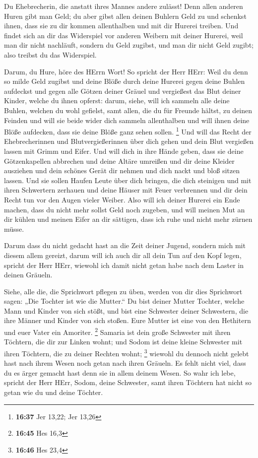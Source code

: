  Du Ehebrecherin, die anstatt ihres Mannes andere zulässt!
 Denn allen anderen Huren gibt man Geld; du aber gibst
allen deinen Buhlern Geld zu und schenkst ihnen, dass sie zu dir kommen
allenthalben und mit dir Hurerei treiben.  Und findet sich
an dir das Widerspiel vor anderen Weibern mit deiner Hurerei, weil man
dir nicht nachläuft, sondern du Geld zugibst, und man dir nicht Geld
zugibt; also treibst du das Widerspiel.

 Darum, du Hure, höre des HErrn Wort!  So
spricht der Herr HErr: Weil du denn so milde Geld zugibst und deine
Blöße durch deine Hurerei gegen deine Buhlen aufdeckst und gegen alle
Götzen deiner Gräuel und vergießest das Blut deiner Kinder, welche du
ihnen opferst:  darum, siehe, will ich sammeln alle deine
Buhlen, welchen du wohl gefielst, samt allen, die du für Freunde hältst,
zu deinen Feinden und will sie beide wider dich sammeln allenthalben und
will ihnen deine Blöße aufdecken, dass sie deine Blöße ganz sehen
sollen. \footnote{\textbf{16:37} Jer 13,22; Jer 13,26}  Und
will das Recht der Ehebrecherinnen und Blutvergießerinnen über dich
gehen und dein Blut vergießen lassen mit Grimm und Eifer. 
Und will dich in ihre Hände geben, dass sie deine Götzenkapellen
abbrechen und deine Altäre umreißen und dir deine Kleider ausziehen und
dein schönes Gerät dir nehmen und dich nackt und bloß sitzen lassen.
 Und sie sollen Haufen Leute über dich bringen, die dich
steinigen und mit ihren Schwertern zerhauen  und deine
Häuser mit Feuer verbrennen und dir dein Recht tun vor den Augen vieler
Weiber. Also will ich deiner Hurerei ein Ende machen, dass du nicht mehr
sollst Geld noch zugeben,  und will meinen Mut an dir
kühlen und meinen Eifer an dir sättigen, dass ich ruhe und nicht mehr
zürnen müsse.

 Darum dass du nicht gedacht hast an die Zeit deiner
Jugend, sondern mich mit diesem allem gereizt, darum will ich auch dir
all dein Tun auf den Kopf legen, spricht der Herr HErr, wiewohl ich
damit nicht getan habe nach dem Laster in deinen Gräueln.

 Siehe, alle die, die Sprichwort pflegen zu üben, werden
von dir dies Sprichwort sagen: „Die Tochter ist wie die Mutter.``
 Du bist deiner Mutter Tochter, welche Mann und Kinder von
sich stößt, und bist eine Schwester deiner Schwestern, die ihre Männer
und Kinder von sich stoßen. Eure Mutter ist eine von den Hethitern und
euer Vater ein Amoriter. \footnote{\textbf{16:45} Hes 16,3}
 Samaria ist dein große Schwester mit ihren Töchtern, die
dir zur Linken wohnt; und Sodom ist deine kleine Schwester mit ihren
Töchtern, die zu deiner Rechten wohnt; \footnote{\textbf{16:46} Hes 23,4}
 wiewohl du dennoch nicht gelebt hast nach ihrem Wesen noch
getan nach ihren Gräueln. Es fehlt nicht viel, dass du es ärger gemacht
hast denn sie in allem deinem Wesen.  So wahr ich lebe,
spricht der Herr HErr, Sodom, deine Schwester, samt ihren Töchtern hat
nicht so getan wie du und deine Töchter.


